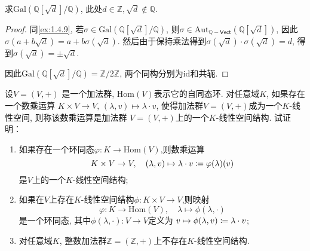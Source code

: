 \begin{problem}
    求$\mathrm{Gal}\left(\mathbb{Q}[\sqrt{d}]/\mathbb{Q}\right)$,
此处$d \in \mathbb{Z}, \sqrt{d} \notin \mathbb{Q}$.
\end{problem}

\begin{proof}
    同\ref{ex:1.4.9}, 若$\sigma \in \mathrm{Gal}\left(\mathbb{Q}[\sqrt{d}]/\mathbb{Q}\right)$, 则$\sigma \in \mathrm{Aut}_{\mathbb{Q}-\mathsf{Vect}}\left(\mathbb{Q}[\sqrt{d}]\right)$, 因此$\sigma(a + b\sqrt{d}) = a + b\sigma(\sqrt{d})$. 然后由于保持乘法得到$\sigma(\sqrt{d}) \cdot \sigma(\sqrt{d}) = d$, 得到$\sigma(\sqrt{d}) = \pm\sqrt{d}$.

    因此$\mathrm{Gal}\left(\mathbb{Q}[\sqrt{d}]/\mathbb{Q}\right) = \mathbb{Z}/2\mathbb{Z}$,
    两个同构分别为$\mathrm{id}$和共轭.
\end{proof}

\begin{problem}\label{ex:1.4.13}
    设$V = (V, +)$ 是一个加法群, $\mathrm{Hom}(V)$表示它的自同态环.
对任意域$K$, 如果存在一个数乘运算
$K \times V \to V,\, (\lambda,v) \mapsto \lambda \cdot v$,
使得加法群$V = (V, +)$成为一个$K$-线性空间, 则称该数乘运算是加法群
$V = (V, +)$上的一个$K$-线性空间结构. 试证明：
\begin{enumerate}[(1)]
    \item 如果存在一个环同态$\varphi:K \to \mathrm{Hom}(V)$,则数乘运算
\[
    K \times V \to V,\quad (\lambda, v) \mapsto \lambda \cdot v \mathrel{\coloneqq} \varphi(\lambda)(v)
\]
是$V$上的一个$K$-线性空间结构;
    \item 如果在$V$上存在$K$-线性空间结构$\phi:K \times V \to V$,则映射
\[
    \varphi:K \to \mathrm{Hom}(V),\quad \lambda \mapsto \phi(\lambda, \cdot)
\]
是一个环同态, 其中$\phi(\lambda, \cdot):V \to V$定义为
$v \mapsto \phi(\lambda, v) \mathrel{\coloneqq} \lambda \cdot v$;
    \item 对任意域$K$, 整数加法群$\mathbb{Z} = (\mathbb{Z}, +)$上不存在$K$-线性空间结构.
\end{enumerate}
\end{problem}

